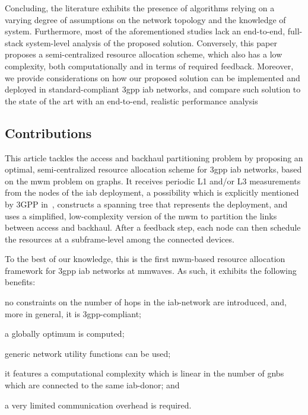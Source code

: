 Concluding, the literature exhibits the presence of algorithms relying on a varying degree of assumptions on the network topology and the knowledge of system. Furthermore, most of the aforementioned studies lack an end-to-end, full-stack system-level analysis of the proposed solution.
Conversely, this paper proposes a semi-centralized resource allocation scheme, which also has a low complexity, both computationally and in terms of required feedback. Moreover, we provide considerations on how our proposed solution can be implemented and deployed in standard-compliant \gls{3gpp} \gls{iab} networks, and compare such solution to the state of the art with an end-to-end, realistic performance analysis

\subsection{Contributions}
\label{sec:contributions}

This article tackles the access and backhaul partitioning problem by proposing an optimal, semi-centralized resource allocation scheme for \gls{3gpp} \gls{iab} networks, based on the \gls{mwm} problem on graphs.  It receives periodic L1 and/or L3 measurements from the nodes of the \gls{iab} deployment, a possibility which is explicitly mentioned by 3GPP in~\cite[Section 7.3.3]{3gpp_38_874}, constructs a spanning tree that represents the deployment, and uses a simplified, low-complexity version of the \gls{mwm} to partition the links between access and backhaul. After a feedback step, each node can then schedule the resources at a subframe-level among the connected devices. 

To the best of our knowledge, this is the first \gls{mwm}-based resource allocation framework for \gls{3gpp} \gls{iab} networks at \glspl{mmwave}. As such, it exhibits the following benefits:
\begin{enumerate*}[label=(\roman*)]
  \item no constraints on the number of hops in the \gls{iab}-network are introduced, and, more in general, it is \gls{3gpp}-compliant;
  \item a globally optimum is computed;
  \item generic network utility functions can be used;
  \item it features a computational complexity which is linear in the number of \glspl{gnb} which are connected to the same \gls{iab}-donor; and 
  \item a very limited communication overhead is required.
\end{enumerate*}

